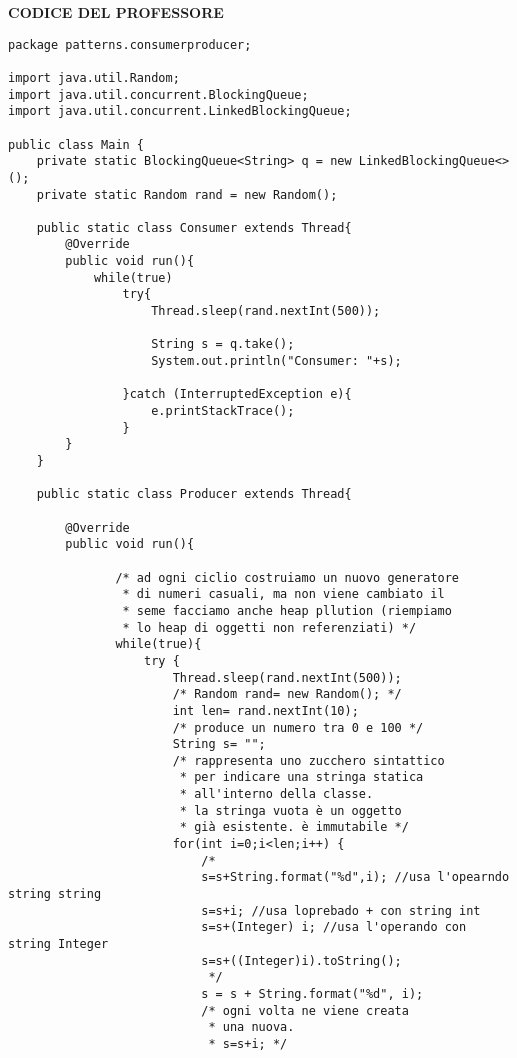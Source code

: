\noindent \textbf{CODICE DEL PROFESSORE} \newline
\begin{lstlisting}
package patterns.consumerproducer;

import java.util.Random;
import java.util.concurrent.BlockingQueue;
import java.util.concurrent.LinkedBlockingQueue;

public class Main {
    private static BlockingQueue<String> q = new LinkedBlockingQueue<>();
    private static Random rand = new Random();

    public static class Consumer extends Thread{
        @Override
        public void run(){
            while(true)
                try{
                    Thread.sleep(rand.nextInt(500));

                    String s = q.take();
                    System.out.println("Consumer: "+s);

                }catch (InterruptedException e){
                    e.printStackTrace();
                }
        }
    }

    public static class Producer extends Thread{

        @Override
        public void run(){

               /* ad ogni ciclio costruiamo un nuovo generatore
                * di numeri casuali, ma non viene cambiato il 
                * seme facciamo anche heap pllution (riempiamo
                * lo heap di oggetti non referenziati) */
               while(true){
                   try {
                       Thread.sleep(rand.nextInt(500));
                       /* Random rand= new Random(); */
                       int len= rand.nextInt(10); 
                       /* produce un numero tra 0 e 100 */
                       String s= ""; 
                       /* rappresenta uno zucchero sintattico
                        * per indicare una stringa statica
                        * all'interno della classe.
                        * la stringa vuota è un oggetto
                        * già esistente. è immutabile */
                       for(int i=0;i<len;i++) {
                           /*
                           s=s+String.format("%d",i); //usa l'opearndo string string
                           s=s+i; //usa loprebado + con string int
                           s=s+(Integer) i; //usa l'operando con string Integer
                           s=s+((Integer)i).toString();
                            */
                           s = s + String.format("%d", i);
                           /* ogni volta ne viene creata
                            * una nuova.
                            * s=s+i; */


\end{lstlisting}
